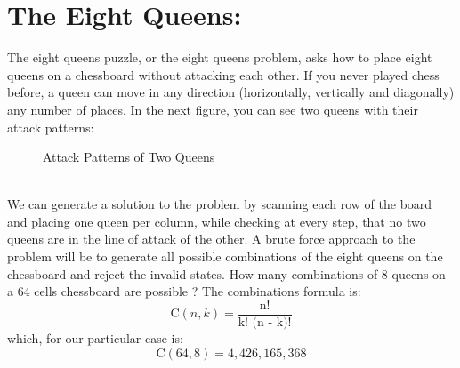 \documentclass[12pt,a4paper]{article}
\begin{document}
\section{The Eight Queens:}
The eight queens puzzle, or the eight queens problem, asks how to place eight queens on a chessboard without attacking each other. If you never played chess before, a queen can move in any direction (horizontally, vertically and diagonally) any number of places. In the next figure, you can see two queens with their attack patterns:
\begin{figure}[!h]
	\begin{center}
	\end{center}
	\caption{Attack Patterns of Two Queens}
\end{figure}\\
We can generate a solution to the problem by scanning each row of the board and placing one queen per column, while checking at every step, that no two queens are in the line of attack of the other. A brute force approach to the problem will be to generate all possible combinations of the eight queens on the chessboard and reject the invalid states. How many combinations of 8 queens on a 64 cells chessboard are possible ? The combinations formula is:
\begin{equation}
\text{C}(n, k) = \frac{\text{n!}}{\text{k! (n - k)!}}
\end{equation}
which, for our particular case is:
\begin{equation}
\text{C}(64, 8) = 4,426,165,368
\end{equation}
\end{document}
